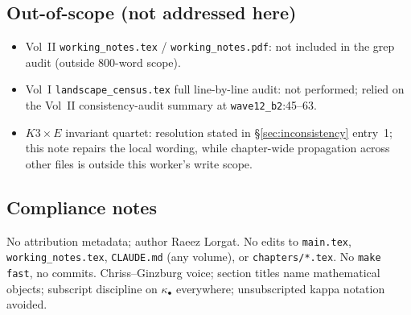 \documentclass[11pt]{article}
\theoremstyle{definition}
\theoremstyle{remark}
\begin{document}
\subsection{Out-of-scope (not addressed here)}

\begin{itemize}[leftmargin=1.5em]
\item Vol~II \texttt{working\_notes.tex} / \texttt{working\_notes.pdf}:
not included in the grep audit (outside 800-word scope).
\item Vol~I \texttt{landscape\_census.tex} full line-by-line audit: not
performed; relied on the Vol~II consistency-audit summary at
\texttt{wave12\_b2}:45--63.
\item $K3\times E$ invariant quartet: resolution stated in
\S\ref{sec:inconsistency} entry~1; this note repairs the local wording,
while chapter-wide propagation across other files is outside this
worker's write scope.
\end{itemize}

\subsection{Compliance notes}

No attribution metadata; author Raeez Lorgat. No edits to
\texttt{main.tex}, \texttt{working\_notes.tex}, \texttt{CLAUDE.md} (any
volume), or \texttt{chapters/*.tex}. No \texttt{make fast}, no commits.
Chriss--Ginzburg voice; section titles name mathematical objects;
subscript discipline on $\kappa_\bullet$ everywhere; unsubscripted
kappa notation avoided.
\end{document}
